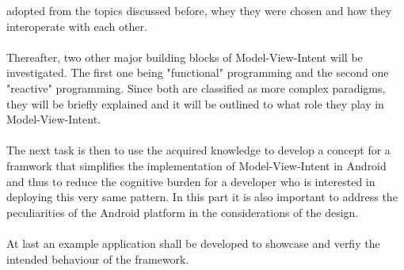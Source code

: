 adopted from the topics discussed before, whey they were chosen and how they interoperate with each other.
\\
\\
Thereafter, two other major building blocks of Model-View-Intent will be investigated. The first one being "functional" programming and the second one "reactive" programming.
Since both are classified as more complex paradigms, they will be briefly explained and it will be outlined to what role they play in Model-View-Intent.
\\
\\
The next task is then to use the acquired knowledge to develop a concept for a framwork that simplifies the implementation of Model-View-Intent in Android and thus to reduce
the cognitive burden for a developer who is interested in deploying this very same pattern. In this part it is also important to address the peculiarities of the Android platform 
in the considerations of the design. 
\\
\\
At last an example application shall be developed to showcase and verfiy the intended behaviour of the framework.